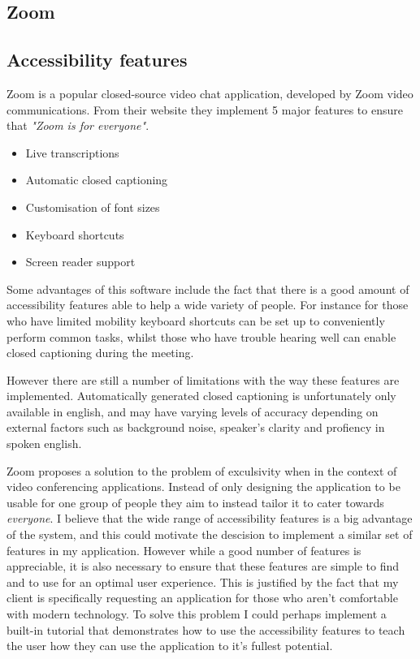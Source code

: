 \subsection{Zoom}

\subsection*{Accessibility features}

Zoom is a popular closed-source video chat application,
developed by Zoom video communications. From their website 
\cite{zoom} they implement 5 major features to ensure that 
\textit{"Zoom is for everyone"}. 

\begin{itemize}
  \item Live transcriptions
  \item Automatic closed captioning
  \item Customisation of font sizes
  \item Keyboard shortcuts
  \item Screen reader support
\end{itemize}

Some advantages of this software include the fact that there
is a good amount of accessibility features able to help a wide
variety of people. For instance for those who have limited 
mobility keyboard shortcuts can be set up to conveniently 
perform common tasks, whilst those who have trouble hearing
well can enable closed captioning during the meeting.

\vspace{0.2cm}

However there are still a number of limitations with the way 
these features are implemented. Automatically generated 
closed captioning is unfortunately only available in english,
and may have varying levels of accuracy depending on external
factors such as background noise, speaker's clarity and 
profiency in spoken english.

\vspace{0.2cm}

Zoom proposes a solution to the problem of exculsivity when in 
the context of video conferencing applications. Instead of only
designing the application to be usable for one group of people
they aim to instead tailor it to cater towards 
\textit{everyone}. I believe that the wide range of
accessibility features is a big advantage of the system, and 
this could motivate the descision to implement a similar set
of features in my application. However while a good number of 
features is appreciable, it is also necessary to ensure that 
these features are simple to find and to use for an optimal 
user experience. This is justified by the fact that my client
is specifically requesting an application for those who aren't
comfortable with modern technology. To solve this problem I 
could perhaps implement a built-in tutorial that demonstrates 
how to use the accessibility features to teach the user how 
they can use the application to it's fullest potential.

